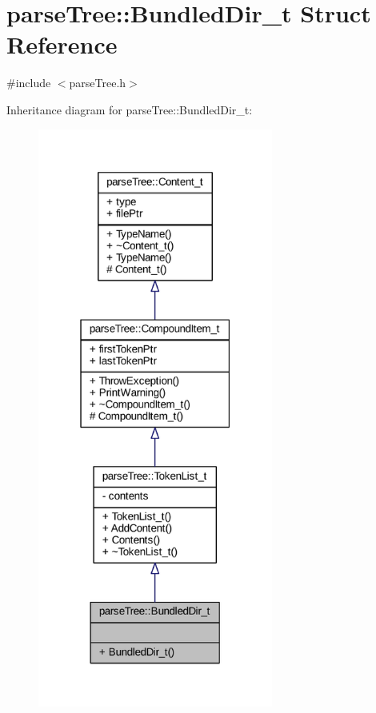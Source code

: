 \hypertarget{structparse_tree_1_1_bundled_dir__t}{}\section{parse\+Tree\+:\+:Bundled\+Dir\+\_\+t Struct Reference}
\label{structparse_tree_1_1_bundled_dir__t}


{\ttfamily \#include $<$parse\+Tree.\+h$>$}



Inheritance diagram for parse\+Tree\+:\+:Bundled\+Dir\+\_\+t\+:
\nopagebreak
\begin{figure}[H]
\begin{center}
\leavevmode
\includegraphics[width=219pt]{structparse_tree_1_1_bundled_dir__t__inherit__graph}
\end{center}
\end{figure}


